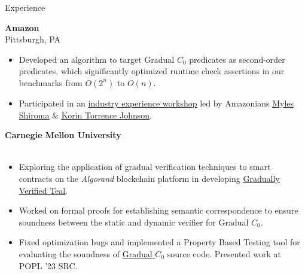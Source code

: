 \begin{rSection}{Experience}
	{\textbf{\large{Amazon}} \hfill \color{darkgray}{06/2023 - 08/2023} 
	\\ \vspace*{1mm}
	 \hfill{Pittsburgh, PA} 
	\\ 
	\color{black}
	\begin{minipage}{40em}
		\begin{itemize}
			\item Developed an algorithm to target Gradual $C_0$ predicates as second-order predicates, which significantly optimized runtime check assertions in our benchmarks from $O(2^n)$ to $O(n)$.
			\item Participated in an \href{https://s3d.cmu.edu/sure/index.html}{\underline{industry experience workshop}} led by Amazonians \href{https://www.linkedin.com/in/myles-shiroma-a850a89/}{\underline{Myles Shiroma}} \& \href{https://www.linkedin.com/in/korin-torrence-johnson/}{\underline{Korin Torrence Johnson}}.
		\end{itemize}
	\end{minipage}}

	{\textbf{\large{Carnegie Mellon University}} \hfill \color{darkgray}{06/2022 - Present} 
	\\ \vspace*{1mm}
	 \hfill \color{darkgray}{Pittsburgh, PA} 
	\\ 
	\color{black}
	\begin{minipage}{40em}
		\begin{itemize}
			\item Exploring the application of gradual verification techniques to smart contracts on the \textit{Algorand} blockchain platform in developing \href{https://github.com/gradual-verification/gradual-TEAL}{\underline{Gradually Verified Teal}}.
			\item Worked on formal proofs for establishing semantic correspondence to ensure soundness between the static and dynamic verifier for Gradual $C_0$. 
			\item Fixed optimization bugs and implemented a Property Based Testing tool for evaluating the soundness of \href{https://github.com/gradual-verification/gvc0}{\underline{Gradual $C_0$}} source code. Presented work at POPL '23 SRC.
		\end{itemize}
	\end{minipage}} 


\end{rSection}
